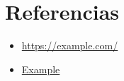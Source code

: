 \section{Referencias}

\begin{itemize}
    \item \url{https://example.com/}
    \item \href{https://example.com/}{Example}
\end{itemize}